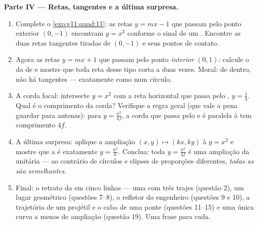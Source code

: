 \begin{problem}
\medskip
\noindent\textbf{Parte IV --- Retas, tangentes e a última
surpresa.}
\begin{enumerate}[resume]
  \item Complete o \cref{exo:g11:quad:11}: as retas
        $y = mx - 1$ que passam pelo ponto exterior $(0, -1)$
        encontram $y = x^2$ conforme o sinal de um
        . Encontre as duas retas tangentes tiradas
        de $(0, -1)$ e seus pontos de contato.
  \item Agora as retas $y = mx + 1$ que passam pelo ponto
        \emph{interior} $(0, 1)$: calcule o  da
         de  e mostre que toda reta desse tipo
        corta a  duas vezes. Moral: de dentro, não há
        tangentes --- exatamente como num círculo.
  \item A corda focal: intersecte $y = x^2$ com a reta
        horizontal que passa pelo , $y = \frac14$. Qual é o
        comprimento da corda? Verifique a regra geral (que vale a
        pena guardar para antenas): para $y = \frac{x^2}{4f}$, a
        corda que passa pelo  e é paralela à  tem
        comprimento $4f$.
  \item A última surpresa: aplique a ampliação
        $(x, y) \mapsto (kx, ky)$ à  $y = x^2$ e mostre
        que a  é exatamente $y = \frac{x^2}{k}$. Conclua:
        toda  $y = \frac{x^2}{4f}$ é uma ampliação da
         unitária --- ao contrário de círculos e elipses
        de proporções diferentes, \emph{todas as  são
        semelhantes}.
  \item Final: o retrato da  em cinco linhas --- uma
         com três trajes (questão 2), um lugar geométrico
        (questões 7--8), o refletor do engenheiro (questões 9 e
        10), a trajetória de um projétil e o cabo de uma ponte
        (questões 11--15) e uma única curva a menos de ampliação
        (questão 19). Uma frase para cada.
\end{enumerate}
\end{problem}
